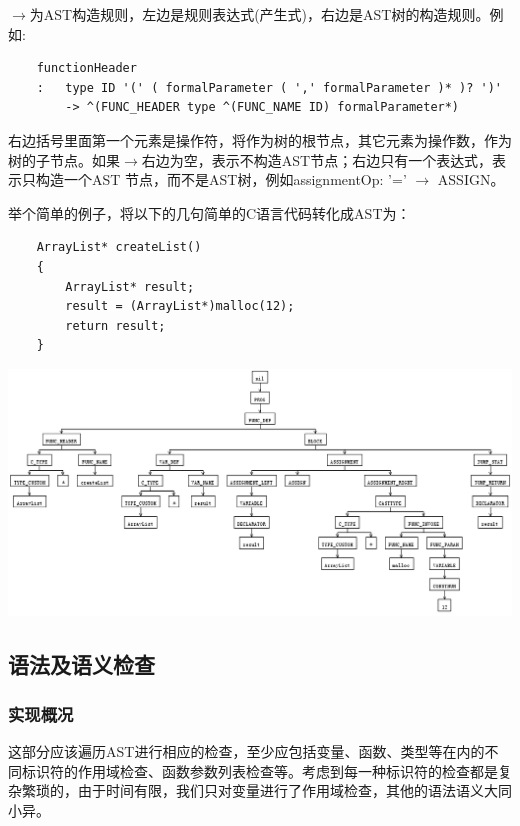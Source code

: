\documentclass[a4paper]{article}
\begin{document}
\begin{CJK*}{UTF8}{gbsn}
    \par $\rightarrow$为AST构造规则，左边是规则表达式(产生式)，右边是AST树的构造规则。例如:
    \begin{verbatim}
    functionHeader
    :   type ID '(' ( formalParameter ( ',' formalParameter )* )? ')'
    	-> ^(FUNC_HEADER type ^(FUNC_NAME ID) formalParameter*)
    \end{verbatim}
    \par 右边括号里面第一个元素是操作符，将作为树的根节点，其它元素为操作数，作为树的子节点。如果$\rightarrow$右边为空，表示不构造AST节点；右边只有一个表达式，表示只构造一个AST 节点，而不是AST树，例如assignmentOp: '=' $\rightarrow$ ASSIGN。
    \par 举个简单的例子，将以下的几句简单的C语言代码转化成AST为：
    \begin{verbatim}
    ArrayList* createList()
    {
        ArrayList* result;
        result = (ArrayList*)malloc(12);
        return result;
    }
    \end{verbatim}
    \begin{center}
    \includegraphics[width=6in]{ASTdemo.png}
    \end{center}
    
    \subsection{语法及语义检查}
    \subsubsection{实现概况}
    这部分应该遍历AST进行相应的检查，至少应包括变量、函数、类型等在内的不同标识符的作用域检查、函数参数列表检查等。考虑到每一种标识符的检查都是复杂繁琐的，由于时间有限，我们只对变量进行了作用域检查，其他的语法语义大同小异。


\end{CJK*}
\end{document}
